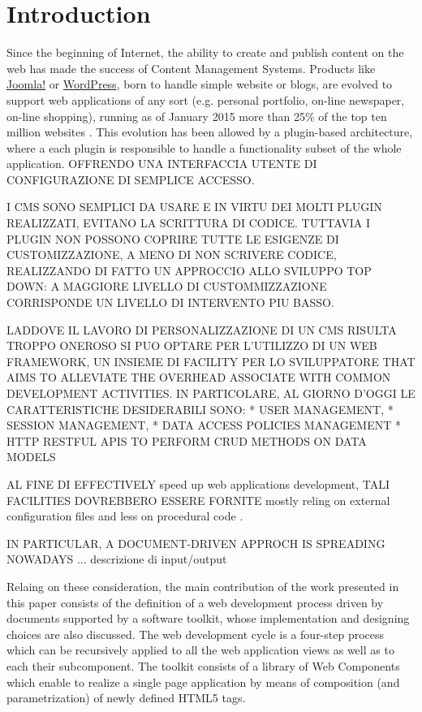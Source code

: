 \section{Introduction}\label{sec:introduction}

Since the beginning of Internet, the ability to create and publish content on the web has made the success of Content Management Systems. Products like \href{http://www.joomla.org/}{Joomla!} or \href{https://wordpress.org/}{WordPress}, born to handle simple website or blogs, are evolved to support web applications of any sort (e.g.  personal portfolio, on-line newspaper, on-line shopping), running as of January 2015 more than 25\% of the top ten million websites \cite{usage-cms}. This evolution has been allowed by a plugin-based architecture, where a each plugin is responsible to handle a functionality subset of the whole application.
OFFRENDO UNA INTERFACCIA UTENTE DI CONFIGURAZIONE DI SEMPLICE ACCESSO.

I CMS SONO SEMPLICI DA USARE E IN VIRTU DEI MOLTI PLUGIN REALIZZATI, EVITANO LA SCRITTURA DI CODICE. 
TUTTAVIA I PLUGIN NON POSSONO COPRIRE TUTTE LE ESIGENZE DI CUSTOMIZZAZIONE, A MENO DI NON SCRIVERE CODICE, REALIZZANDO DI FATTO UN APPROCCIO ALLO SVILUPPO TOP DOWN: A MAGGIORE LIVELLO DI CUSTOMMIZZAZIONE CORRISPONDE UN LIVELLO DI INTERVENTO PIU BASSO.

LADDOVE IL LAVORO DI PERSONALIZZAZIONE DI UN CMS RISULTA TROPPO ONEROSO SI PUO OPTARE PER L'UTILIZZO DI UN WEB FRAMEWORK, UN INSIEME DI FACILITY PER LO SVILUPPATORE THAT AIMS TO ALLEVIATE THE OVERHEAD ASSOCIATE WITH COMMON DEVELOPMENT ACTIVITIES.
IN PARTICOLARE, AL GIORNO D'OGGI LE CARATTERISTICHE DESIDERABILI SONO:
* USER MANAGEMENT,
* SESSION MANAGEMENT, 
* DATA ACCESS POLICIES MANAGEMENT
* HTTP RESTFUL APIS TO PERFORM CRUD METHODS ON DATA MODELS

AL FINE DI EFFECTIVELY speed up web applications development, TALI FACILITIES DOVREBBERO ESSERE FORNITE mostly reling on external configuration files and less on procedural code \cite{6859693}.

IN PARTICULAR, A DOCUMENT-DRIVEN APPROCH IS SPREADING NOWADAYS ... descrizione di input/output




Relaing on these consideration, the main contribution of the work presented in this paper consists of the definition of a web development process driven by documents supported by a software toolkit, whose implementation and designing choices are also discussed. The web development cycle is a four-step process which can be recursively applied to all the web application views as well as to each their subcomponent. The toolkit consists of a library of Web Components which enable to realize a single page application by means of composition (and parametrization) of newly defined HTML5 tags.


